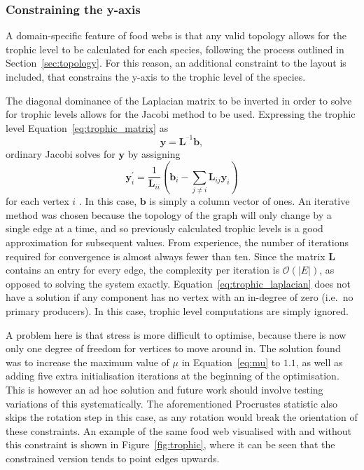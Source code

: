 \subsubsection{Constraining the y-axis}
A domain-specific feature of food webs is that any valid topology allows for the trophic level to be calculated for each species, following the process outlined in Section~\ref{sec:topology}. For this reason, an additional constraint to the layout is included, that constrains the y-axis to the trophic level of the species.

The diagonal dominance of the Laplacian matrix to be inverted in order to solve for trophic levels allows for the Jacobi method to be used. Expressing the trophic level Equation~\eqref{eq:trophic_matrix} as 
\begin{equation}
  \mathbf{y} = \mathbf{L}^{\text{--}1}\mathbf{b},
  \label{eq:trophic_laplacian}
\end{equation}
ordinary Jacobi solves for $\mathbf{y}$ by assigning
\begin{equation}
  \mathbf{y}_i^\prime = \frac{1}{\mathbf{L}_{ii}}\left(\mathbf{b}_i - \sum_{j\neq i}\mathbf{L}_{ij}\mathbf{y}_i\right)
\end{equation}
for each vertex $i$ \cite{Young2014}. In this case, $\mathbf{b}$ is simply a column vector of ones.
An iterative method was chosen because the topology of the graph will only change by a single edge at a time, and so previously calculated trophic levels is a good approximation for subsequent values. From experience, the number of iterations required for convergence is almost always fewer than ten. Since the matrix $\mathbf{L}$ contains an entry for every edge, the complexity per iteration is $\mathcal{O}(|E|)$, as opposed to solving the system exactly. 
Equation~\eqref{eq:trophic_laplacian} does not have a solution if any component has no vertex with an in-degree of zero (i.e.\ no primary producers). In this case, trophic level computations are simply ignored.

A problem here is that stress is more difficult to optimise, because there is now only one degree of freedom for vertices to move around in. The solution found was to increase the maximum value of $\mu$ in Equation~\eqref{eq:mu} to $1.1$, as well as adding five extra initialisation iterations at the beginning of the optimisation. This is however an ad hoc solution and future work should involve testing variations of this systematically.
The aforementioned Procrustes statistic also skips the rotation step in this case, as any rotation would break the orientation of these constraints.
An example of the same food web visualised with and without this constraint is shown in Figure~\ref{fig:trophic}, where it can be seen that the constrained version tends to point edges upwards.

